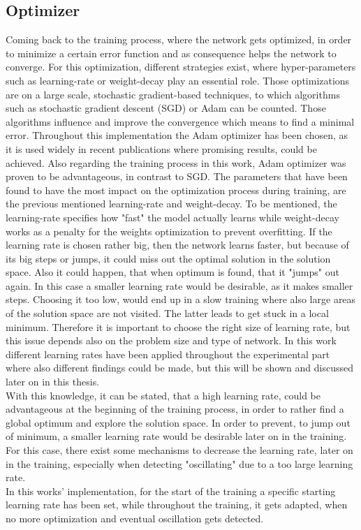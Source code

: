 \subsection{Optimizer}
Coming back to the training process, where the network gets optimized, in order to minimize a certain error function and as consequence helps the network to converge. For this optimization, different strategies exist, where hyper-parameters such as learning-rate or weight-decay play an essential role. Those optimizations are on a large scale, stochastic gradient-based techniques, to which algorithms such as stochastic gradient descent (SGD) or Adam can be counted. Those algorithms influence and improve the convergence which means to find a minimal error. Throughout this implementation the Adam optimizer \cite{Kingma2014} has been chosen, as it is used widely in recent publications where promising results, could be achieved. Also regarding the training process in this work, Adam optimizer was proven to be advantageous, in contrast to SGD. The parameters that have been found to have the most impact on the optimization process during training, are the previous mentioned learning-rate and weight-decay. To be mentioned, the learning-rate specifies how "fast" the model actually learns while weight-decay works as a penalty for the weights optimization to prevent overfitting. If the learning rate is chosen rather big, then the network learns faster, but because of its big steps or jumps, it could miss out the optimal solution in the solution space. Also it could happen, that when optimum is found, that it "jumps" out again. In this case a smaller learning rate would be desirable, as it makes smaller steps. Choosing it too low, would end up in a slow training where also large areas of the solution space are not visited. The latter leads to get stuck in a local minimum. Therefore it is important to choose the right size of learning rate, but this issue depends also on the problem size and type of network. In this work different learning rates have been applied throughout the experimental part where also different findings could be made, but this will be shown and discussed later on in this thesis.\\
With this knowledge, it can be stated, that a high learning rate, could be advantageous at the beginning of the training process, in order to rather find a global optimum and explore the solution space. In order to prevent, to jump out of minimum, a smaller learning rate would be desirable later on in the training. For this case, there exist some mechanisms to decrease the learning rate, later on in the training, especially when detecting "oscillating" due to a too large learning rate.\\
In this works' implementation, for the start of the training a specific starting learning rate has been set, while throughout the training, it gets adapted, when no more optimization and eventual oscillation gets detected. 


